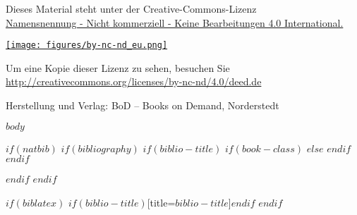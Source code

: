 \documentclass[10pt,paper=17cm:22cm, twoside=true, DIV=14]{scrbook}
\begin{document}
\begin{titlepage}
\begin{center}
\begin{center}
   Dieses Material steht unter der Creative-Commons-Lizenz\\
   \href{http://creativecommons.org/licenses/by-nc-nd/4.0/deed.de}{Namensnennung - Nicht kommerziell - Keine Bearbeitungen 4.0 International.} \\
    \end{center}
    \begin{center}
        \href{http://creativecommons.org/licenses/by-nc-nd/4.0/deed.de}{\texttt{[image: figures/by-nc-nd\_eu.png]}}
    \end{center}
	\begin{center}
       Um eine Kopie dieser Lizenz zu sehen, besuchen Sie\\
       \href{http://creativecommons.org/licenses/by-nc-nd/4.0/deed.de}{http://creativecommons.org/licenses/by-nc-nd/4.0/deed.de}\\
	\end{center}
	Herstellung und Verlag: BoD – Books on Demand, Norderstedt
\end{center}
\end{titlepage}
\cleardoublepage

\setcounter{tocdepth}{2}
\tableofcontents

\mainmatter

$body$

$if(natbib)$
$if(bibliography)$
$if(biblio-title)$
$if(book-class)$
\renewcommand\bibname{$biblio-title$}
$else$
\renewcommand\refname{$biblio-title$}
$endif$
$endif$

$endif$
$endif$

$if(biblatex)$
\printbibliography$if(biblio-title)$[title=$biblio-title$]$endif$
$endif$
\end{document}

